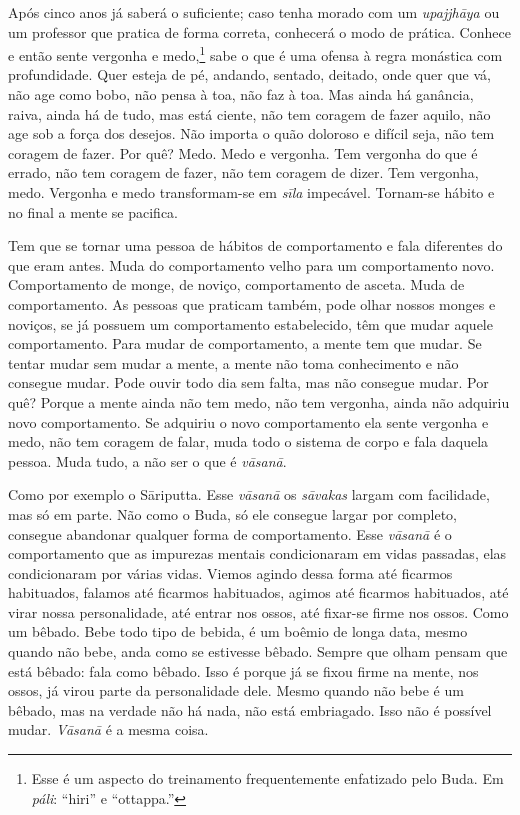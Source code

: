 Após cinco anos já saberá o suficiente; caso tenha morado com um
\textit{upajjhāya} ou um professor que pratica de forma correta,
conhecerá o modo de prática. Conhece e então sente vergonha e
medo,\footnote{Esse é um aspecto do treinamento frequentemente
enfatizado pelo Buda. Em \textit{páli}: “hiri” e “ottappa.”} sabe o
que é uma ofensa à regra monástica com profundidade. Quer esteja de pé,
andando, sentado, deitado, onde quer que vá, não age como bobo, não
pensa à toa, não faz à toa. Mas ainda há ganância, raiva, ainda há de
tudo, mas está ciente, não tem coragem de fazer aquilo, não age sob a
força dos desejos. Não importa o quão doloroso e difícil seja, não tem
coragem de fazer. Por quê? Medo. Medo e vergonha. Tem vergonha do que é
errado, não tem coragem de fazer, não tem coragem de dizer. Tem
vergonha, medo. Vergonha e medo transformam-se em \textit{sīla}
impecável. Tornam-se hábito e no final a mente se pacifica. 

Tem que se tornar uma pessoa de hábitos de comportamento e fala
diferentes do que eram antes. Muda do comportamento velho para um
comportamento novo. Comportamento de monge, de noviço, comportamento de
asceta. Muda de comportamento. As pessoas que praticam também, pode
olhar nossos monges e noviços, se já possuem um comportamento
estabelecido, têm que mudar aquele comportamento. Para mudar de
comportamento, a mente tem que mudar. Se tentar mudar sem mudar a
mente, a mente não toma conhecimento e não consegue mudar. Pode ouvir
todo dia sem falta, mas não consegue mudar. Por quê? Porque a mente
ainda não tem medo, não tem vergonha, ainda não adquiriu novo
comportamento. Se adquiriu o novo comportamento ela sente vergonha e
medo, não tem coragem de falar, muda todo o sistema de corpo e fala
daquela pessoa. Muda tudo, a não ser o que é \textit{vāsanā}. 

Como por exemplo o Sāriputta. Esse \textit{vāsanā} os
\textit{sāvakas} largam com facilidade, mas só em parte. Não como o
Buda, só ele consegue largar por completo, consegue abandonar qualquer
forma de comportamento. Esse \textit{vāsanā} é o comportamento que
as impurezas mentais condicionaram em vidas passadas, elas
condicionaram por várias vidas. Viemos agindo dessa forma até ficarmos
habituados, falamos até ficarmos habituados, agimos até ficarmos
habituados, até virar nossa personalidade, até entrar nos ossos, até
fixar-se firme nos ossos. Como um bêbado. Bebe todo tipo de bebida, é
um boêmio de longa data, mesmo quando não bebe, anda como se estivesse
bêbado. Sempre que olham pensam que está bêbado: fala como bêbado. Isso
é porque já se fixou firme na mente, nos ossos, já virou parte da
personalidade dele. Mesmo quando não bebe é um bêbado, mas na verdade
não há nada, não está embriagado. Isso não é possível mudar.
\textit{Vāsanā} é a mesma coisa. 

